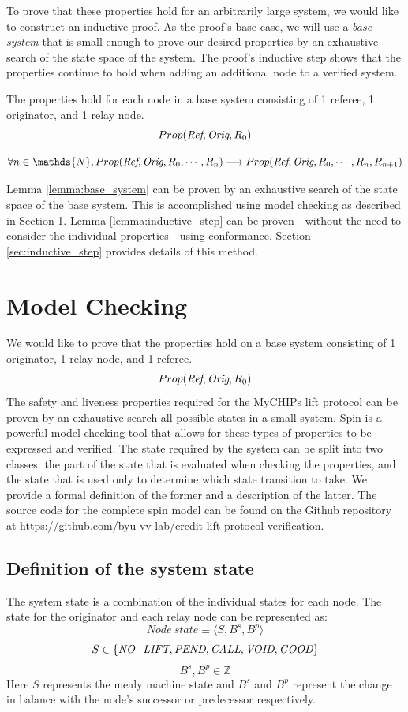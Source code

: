 \documentclass[runningheads]{llncs}
\newcommand{\nolift}{\emph{NO\_LIFT}}
\newcommand{\pend}{\emph{PEND}}
\newcommand{\call}{\emph{CALL}}
\newcommand{\void}{\emph{VOID}}
\newcommand{\good}{\emph{GOOD}}
\newcommand{\coderepository}{Github repository at \url{https://github.com/byu-vv-lab/credit-lift-protocol-verification}}
\begin{document}
To prove that these properties hold for an arbitrarily large system, we would like to construct an inductive proof. As the proof's base case, we will use a \emph{base system} that is small enough to prove our desired properties by an exhaustive search of the state space of the system. The proof's inductive step shows that the properties continue to hold when adding an additional node to a verified system.

\begin{lemma}
\label{lemma:base_system}
The properties hold for each node in a base system consisting of 1 referee, 1 originator, and 1 relay node.
$$
Prop(\emph{Ref}, \emph{Orig}, R_0)
$$
\end{lemma}

\begin{lemma}
\label{lemma:inductive_step}
$$
\forall n \in \mathds{N}, Prop(\emph{Ref}, \emph{Orig}, R_0, \dotsm, R_n) \longrightarrow Prop(\emph{Ref}, \emph{Orig}, R_0, \dotsm, R_n, R_{n+1})
$$
\end{lemma}

Lemma \ref{lemma:base_system} can be proven by an exhaustive search of the state space of the base system. This is accomplished using model checking as described in Section \ref{chap:model_checking_results}. Lemma \ref{lemma:inductive_step} can be proven---without the need to consider the individual properties---using conformance. Section \ref{sec:inductive_step} provides details of this method.

\section{Model Checking} \label{chap:model_checking_results}
We would like to prove that the properties hold on a base system consisting of 1 originator, 1 relay node, and 1 referee.
$$
Prop(\emph{Ref}, \emph{Orig}, R_0)
$$
The safety and liveness properties required for the MyCHIPs lift protocol can be proven by an exhaustive search all possible states in a small system. Spin is a powerful model-checking tool that allows for these types of properties to be expressed and verified. The state required by the system can be split into two classes: the part of the state that is evaluated when checking the properties, and the state that is used only to determine which state transition to take. We provide a formal definition of the former and a description of the latter. The source code for the complete spin model can be found on the \coderepository.
\subsection{Definition of the system state}\label{sec:statedef}
The system state is a combination of the individual states for each node. The state for the originator and each relay node can be represented as:
$$Node~state \equiv \langle S, B^s, B^p \rangle$$
$$
S \in \{\nolift, \pend, \call, \void, \good\}
$$
$$
B^s, B^p \in \mathds{Z}
$$
Here $S$ represents the mealy machine state and $B^s$ and $B^p$ represent the change in balance with the node's successor or predecessor respectively.
\end{document}
